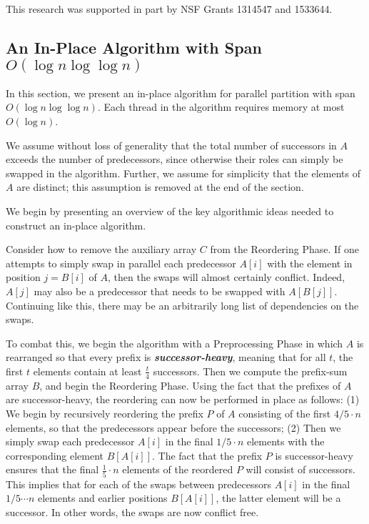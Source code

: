\documentclass[sigplan, 10pt, nonacm]{acmart}
\newcommand{\defn}[1]{{\textit{\textbf{\boldmath #1}}}}
\renewcommand{\paragraph}[1]{\vspace{0.09in}\noindent{\bf \boldmath #1.}}
\theoremstyle{remark}
\theoremstyle{remark}
\begin{document}
This research was supported in part by NSF Grants 1314547 and 1533644. 

\clearpage
\begin{appendices}


\section{An In-Place Algorithm with Span $O(\log n \log \log n)$}\label{secalg}

In this section, we present an in-place algorithm for parallel
partition with span $O(\log n \log \log n)$. Each thread in the
algorithm requires memory at most $O(\log n)$.

We assume without loss of generality that the total number of
successors in $A$ exceeds the number of predecessors, since otherwise
their roles can simply be swapped in the algorithm. Further, we assume
for simplicity that the elements of $A$ are distinct; this assumption
is removed at the end of the section.


\paragraph{Algorithm Outline}
We begin by presenting an overview of the key algorithmic ideas needed
to construct an in-place algorithm.

Consider how to remove the auxiliary array $C$ from the Reordering
Phase. If one attempts to simply swap in parallel each predecessor
$A[i]$ with the element in position $j = B[i]$ of $A$, then the swaps
will almost certainly conflict. Indeed, $A[j]$ may also be a
predecessor that needs to be swapped with $A[B[j]]$. Continuing like
this, there may be an arbitrarily long list of dependencies on the
swaps.

To combat this, we begin the algorithm with a Preprocessing Phase in
which $A$ is rearranged so that every prefix is
\defn{successor-heavy}, meaning that for all $t$, the first $t$
elements contain at least $\frac{t}{4}$ successors. Then we compute
the prefix-sum array $B$, and begin the Reordering Phase. Using the
fact that the prefixes of $A$ are successor-heavy, the reordering can
now be performed in place as follows: (1) We begin by recursively
reordering the prefix $P$ of $A$ consisting of the first $4/5 \cdot n$
elements, so that the predecessors appear before the successors; (2)
Then we simply swap each predecessor $A[i]$ in the final $1/5 \cdot n$
elements with the corresponding element $B[A[i]]$. The fact that the
prefix $P$ is successor-heavy ensures that the final $\frac{1}{5}
\cdot n$ elements of the reordered $P$ will consist of
successors. This implies that for each of the swaps between
predecessors $A[i]$ in the final $1/5 \cdots n$ elements and earlier
positions $B[A[i]]$, the latter element will be a successor. In other
words, the swaps are now conflict free.


\end{appendices}
\end{document}
